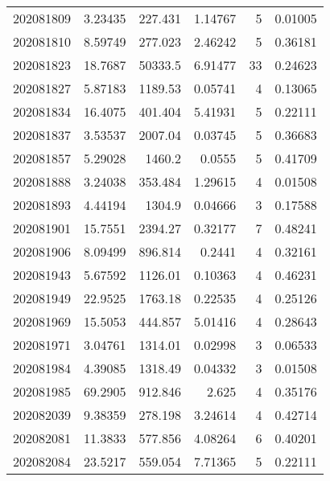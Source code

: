 \begin{tabular}{rrrrrr}
 202081809 &          3.23435 &      227.431  &            1.14767 &           5 & 0.01005 \\
 202081810 &          8.59749 &      277.023  &            2.46242 &           5 & 0.36181 \\
 202081823 &         18.7687  &    50333.5    &            6.91477 &          33 & 0.24623 \\
 202081827 &          5.87183 &     1189.53   &            0.05741 &           4 & 0.13065 \\
 202081834 &         16.4075  &      401.404  &            5.41931 &           5 & 0.22111 \\
 202081837 &          3.53537 &     2007.04   &            0.03745 &           5 & 0.36683 \\
 202081857 &          5.29028 &     1460.2    &            0.0555  &           5 & 0.41709 \\
 202081888 &          3.24038 &      353.484  &            1.29615 &           4 & 0.01508 \\
 202081893 &          4.44194 &     1304.9    &            0.04666 &           3 & 0.17588 \\
 202081901 &         15.7551  &     2394.27   &            0.32177 &           7 & 0.48241 \\
 202081906 &          8.09499 &      896.814  &            0.2441  &           4 & 0.32161 \\
 202081943 &          5.67592 &     1126.01   &            0.10363 &           4 & 0.46231 \\
 202081949 &         22.9525  &     1763.18   &            0.22535 &           4 & 0.25126 \\
 202081969 &         15.5053  &      444.857  &            5.01416 &           4 & 0.28643 \\
 202081971 &          3.04761 &     1314.01   &            0.02998 &           3 & 0.06533 \\
 202081984 &          4.39085 &     1318.49   &            0.04332 &           3 & 0.01508 \\
 202081985 &         69.2905  &      912.846  &            2.625   &           4 & 0.35176 \\
 202082039 &          9.38359 &      278.198  &            3.24614 &           4 & 0.42714 \\
 202082081 &         11.3833  &      577.856  &            4.08264 &           6 & 0.40201 \\
 202082084 &         23.5217  &      559.054  &            7.71365 &           5 & 0.22111 \\

\end{tabular}
